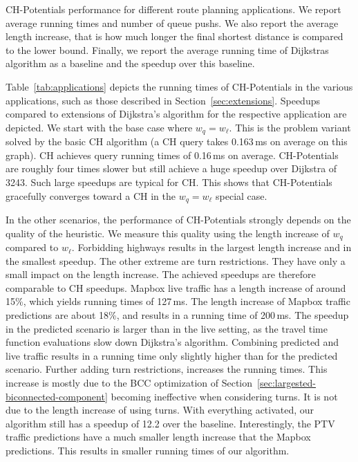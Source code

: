 \documentclass[a4paper,USenglish,cleveref, autoref, thm-restate]{lipics-v2019}
\begin{document}
\begin{table}
\centering
\caption{
CH-Potentials performance for different route planning applications.
We report average running times and number of queue pushs.
We also report the average length increase, that is how much longer the final shortest distance is compared to the lower bound.
Finally, we report the average running time of Dijkstras algorithm as a baseline and the speedup over this baseline.
}\label{tab:applications}

\end{table}

Table~\ref{tab:applications} depicts the running times of CH-Potentials in the various applications, such as those described in Section~\ref{sec:extensions}.
Speedups compared to extensions of Dijkstra's algorithm for the respective application are depicted.
We start with the base case where $w_q = w_\ell$.
This is the problem variant solved by the basic CH algorithm (a CH query takes 0.163\,ms on average on this graph).
CH achieves query running times of 0.16\,ms on average.
CH-Potentials are roughly four times slower but still achieve a huge speedup over Dijkstra of 3243.
Such large speedups are typical for CH.
This shows that CH-Potentials gracefully converges toward a CH in the $w_q = w_\ell$ special case.

In the other scenarios, the performance of CH-Potentials strongly depends on the quality of the heuristic.
We measure this quality using the length increase of $w_q$ compared to $w_\ell$.
Forbidding highways results in the largest length increase and in the smallest speedup.
The other extreme are turn restrictions.
They have only a small impact on the length increase.
The achieved speedups are therefore comparable to CH speedups.
%
Mapbox live traffic has a length increase of around 15\%, which yields running times of 127\,ms.
The length increase of Mapbox traffic predictions are about 18\%, and results in a running time of 200\,ms.
The speedup in the predicted scenario is larger than in the live setting, as the travel time function evaluations slow down Dijkstra's algorithm.
Combining predicted and live traffic results in a running time only slightly higher than for the predicted scenario.
Further adding turn restrictions, increases the running times.
This increase is mostly due to the BCC optimization of Section~\ref{sec:largested-biconnected-component} becoming ineffective when considering turns.
It is not due to the length increase of using turns.
With everything activated, our algorithm still has a speedup of 12.2 over the baseline.
Interestingly, the PTV traffic predictions have a much smaller length increase that the Mapbox predictions.
This results in smaller running times of our algorithm.
\end{document}
